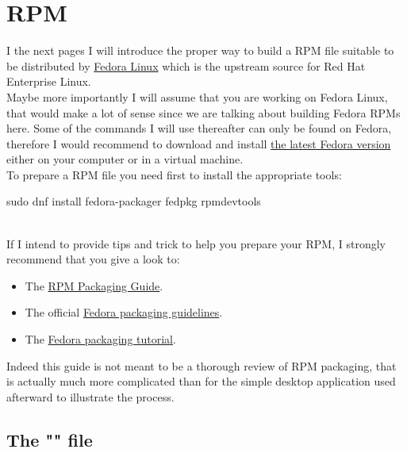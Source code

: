 \section{RPM}

I the next pages I will introduce the proper way to build a RPM file suitable to be distributed by \href{https://www.fedora.org}{Fedora Linux} 
which is the upstream source for Red Hat Enterprise Linux. \\[0.25cm]
Maybe more importantly I will assume that you are working on Fedora Linux, 
that would make a lot of sense since we are talking about building Fedora RPMs here. 
Some of the commands I will use thereafter can only be found on Fedora, 
therefore I would recommend to download and install \href{https://getfedora.org/fr/workstation/download/}{the latest Fedora version} either on your computer or in a virtual machine. \\[0.5cm]
To prepare a RPM file you need first to install the appropriate tools: 
\begin{script}
\fprompt{~} sudo dnf install fedora-packager fedpkg rpmdevtools
\end{script}
\\[-0.5cm]
\noindent If I intend to provide tips and trick to help you prepare your RPM, I strongly recommend that you give a look to:
\begin{itemize}
\item The \href{https://rpm-packaging-guide.github.io/}{RPM Packaging Guide}.
\item The official \href{https://docs.fedoraproject.org/en-US/packaging-guidelines/}{Fedora packaging guidelines}. 
\item The \href{https://docs.fedoraproject.org/en-US/packaging-guidelines/}{Fedora packaging tutorial}.
\end{itemize}
Indeed this guide is not meant to be a thorough review of RPM packaging,  
that is actually much more complicated than for the simple desktop application used afterward to illustrate the process. 

\subsection{The "" file}

